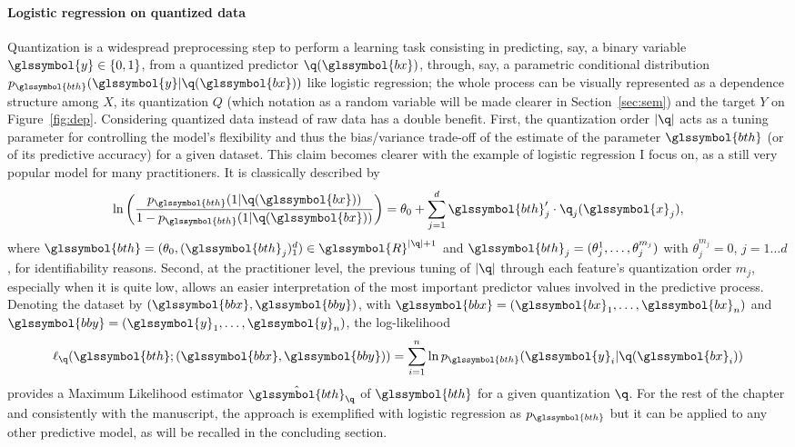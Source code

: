 \paragraph{Logistic regression on quantized data}

Quantization is a widespread preprocessing step to perform a learning task consisting in predicting, say, a binary variable $\glssymbol{y}\in\{0,1\}$, from a quantized predictor  $\q(\glssymbol{bx})$, through, say, a parametric conditional distribution $p_{\glssymbol{bth}}(\glssymbol{y}|\q(\glssymbol{bx}))$ like logistic regression; the whole process can be visually represented as a dependence structure among $X$, its quantization $Q$ (which notation as a random variable will be made clearer in Section~\ref{sec:sem}) and the target $Y$ on Figure~\ref{fig:dep}. Considering quantized data instead of raw data has a double benefit. First, the quantization order $|\q|$ acts as a tuning parameter for controlling the model's flexibility and thus the bias/variance trade-off of the estimate of the parameter $\glssymbol{bth}$ (or of its predictive accuracy) for a given dataset. This claim becomes clearer with the example of logistic regression I focus on, as a still very popular model for many practitioners. It is classically described by
\begin{equation}
    \label{eq:reglogq}
\ln \left( \dfrac{p_{\glssymbol{bth}}(1|\q(\glssymbol{bx}))}{1 - p_{\glssymbol{bth}}(1|\q(\glssymbol{bx}))} \right) = \theta_0 + \sum_{j=1}^d \glssymbol{bth}_j' \cdot \q_j(\glssymbol{x}_j),
\end{equation}
where $\glssymbol{bth} = (\theta_{0},(\glssymbol{bth}_j)_1^d) \in \glssymbol{R}^{|\q|+1}$ and $\glssymbol{bth}_j = (\theta_{j}^{1},\dots,\theta_{j}^{m_j})$ with $\theta_{j}^{m_j} = 0$, $j=1 \ldots d$, for identifiability reasons.
Second, at the practitioner level, the previous tuning of $|\q|$ through each feature's quantization order $m_j$, especially when it is quite low, allows an easier interpretation of the most important predictor values involved in the predictive process. Denoting the dataset by $(\glssymbol{bbx},\glssymbol{bby})$, with $\glssymbol{bbx}=(\glssymbol{bx}_1,\ldots,\glssymbol{bx}_n)$ and $\glssymbol{bby}=(\glssymbol{y}_1,\ldots,\glssymbol{y}_n)$, the log-likelihood 
\begin{equation}
\label{eq:lq}
\ell_{\q}(\glssymbol{bth} ; (\glssymbol{bbx},\glssymbol{bby}))=\sum_{i=1}^n \ln p_{\glssymbol{bth}}(\glssymbol{y}_i|\q(\glssymbol{bx}_i))
\end{equation}
provides a Maximum Likelihood estimator $\hat{\glssymbol{bth}}_\q$ of $\glssymbol{bth}$ for a given quantization $\q$. For the rest of the chapter and consistently with the manuscript, the approach is exemplified with logistic regression as $p_{\glssymbol{bth}}$ but it can be applied to any other predictive model, as will be recalled in the concluding section.



